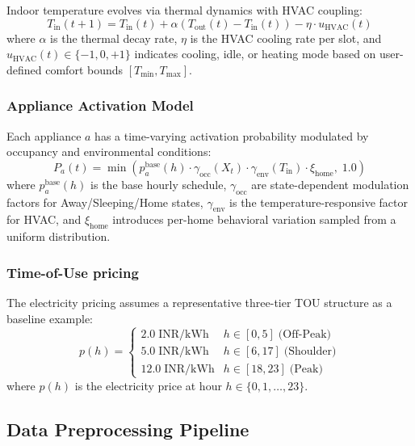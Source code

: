 \documentclass[journal]{IEEEtran}
\begin{document}
Indoor temperature evolves via thermal dynamics with HVAC coupling:
\begin{equation}
    T_{\text{in}}(t+1) = T_{\text{in}}(t) + \alpha(T_{\text{out}}(t) - T_{\text{in}}(t)) - \eta \cdot u_{\text{HVAC}}(t)
    \label{eq:indoor_temp}
\end{equation}
where $\alpha$ is the thermal decay rate, $\eta$ is the HVAC cooling rate per slot, and $u_{\text{HVAC}}(t) \in \{-1, 0, +1\}$ indicates cooling, idle, or heating mode based on user-defined comfort bounds $[T_{\min}, T_{\max}]$.

\subsubsection{Appliance Activation Model} Each appliance $a$ has a time-varying activation probability modulated by occupancy and environmental conditions:
\begin{equation}
    P_a(t) = \min\left(p_a^{\text{base}}(h) \cdot \gamma_{\text{occ}}(X_t) \cdot \gamma_{\text{env}}(T_{\text{in}}) \cdot \xi_{\text{home}}, \; 1.0\right)
    \label{eq:activation}
\end{equation}
where $p_a^{\text{base}}(h)$ is the base hourly schedule, $\gamma_{\text{occ}}$ are state-dependent modulation factors for Away/Sleeping/Home states, $\gamma_{\text{env}}$ is the temperature-responsive factor for HVAC, and $\xi_{\text{home}}$ introduces per-home behavioral variation sampled from a uniform distribution.

\subsubsection{Time-of-Use pricing} The electricity pricing assumes a representative three-tier TOU structure as a baseline example:
\begin{equation}
    p(h) = \begin{cases}
        2.0 \; \text{INR/kWh} & h \in [0, 5] \; \text{(Off-Peak)} \\
        5.0 \; \text{INR/kWh} & h \in [6, 17] \; \text{(Shoulder)} \\
        12.0 \; \text{INR/kWh} & h \in [18, 23] \; \text{(Peak)}
    \end{cases}
    \label{eq:tou}
\end{equation}
where $p(h)$ is the electricity price at hour $h \in \{0, 1, \ldots, 23\}$.

\subsection{Data Preprocessing Pipeline}
\end{document}
